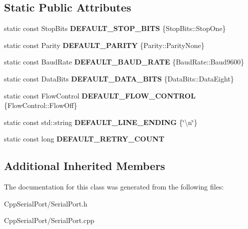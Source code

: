 \subsection*{Static Public Attributes}
\begin{DoxyCompactItemize}
\item 
\mbox{\label{class_cpp_serial_port_1_1_serial_port_a654c959db8c2aec6ae8c2101bc28c74e}} 
static const Stop\+Bits {\bfseries D\+E\+F\+A\+U\+L\+T\+\_\+\+S\+T\+O\+P\+\_\+\+B\+I\+TS} \{Stop\+Bits\+::\+Stop\+One\}
\item 
\mbox{\label{class_cpp_serial_port_1_1_serial_port_a9d6e1bfb16a9281cb3bde9d74118a022}} 
static const Parity {\bfseries D\+E\+F\+A\+U\+L\+T\+\_\+\+P\+A\+R\+I\+TY} \{Parity\+::\+Parity\+None\}
\item 
\mbox{\label{class_cpp_serial_port_1_1_serial_port_a2140def05b9ef513defcd558a6f76bf5}} 
static const Baud\+Rate {\bfseries D\+E\+F\+A\+U\+L\+T\+\_\+\+B\+A\+U\+D\+\_\+\+R\+A\+TE} \{Baud\+Rate\+::\+Baud9600\}
\item 
\mbox{\label{class_cpp_serial_port_1_1_serial_port_a7580640725498c24a02c0683cda290d4}} 
static const Data\+Bits {\bfseries D\+E\+F\+A\+U\+L\+T\+\_\+\+D\+A\+T\+A\+\_\+\+B\+I\+TS} \{Data\+Bits\+::\+Data\+Eight\}
\item 
\mbox{\label{class_cpp_serial_port_1_1_serial_port_ac4b188c8e479c7b555f3375243ffce88}} 
static const Flow\+Control {\bfseries D\+E\+F\+A\+U\+L\+T\+\_\+\+F\+L\+O\+W\+\_\+\+C\+O\+N\+T\+R\+OL} \{Flow\+Control\+::\+Flow\+Off\}
\item 
\mbox{\label{class_cpp_serial_port_1_1_serial_port_a2f7f96304dbc01de3b3d1526a692ca90}} 
static const std\+::string {\bfseries D\+E\+F\+A\+U\+L\+T\+\_\+\+L\+I\+N\+E\+\_\+\+E\+N\+D\+I\+NG} \{\char`\"{}\textbackslash{}n\char`\"{}\}
\item 
\mbox{\label{class_cpp_serial_port_1_1_serial_port_aeef5352ca5292a399e0d36f5af74a23b}} 
static const long {\bfseries D\+E\+F\+A\+U\+L\+T\+\_\+\+R\+E\+T\+R\+Y\+\_\+\+C\+O\+U\+NT}
\end{DoxyCompactItemize}
\subsection*{Additional Inherited Members}


The documentation for this class was generated from the following files\+:\begin{DoxyCompactItemize}
\item 
Cpp\+Serial\+Port/Serial\+Port.\+h\item 
Cpp\+Serial\+Port/Serial\+Port.\+cpp\end{DoxyCompactItemize}
